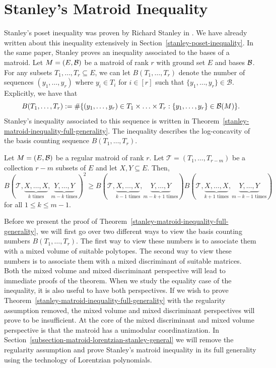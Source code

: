 \documentclass{puthesis-UG}
\begin{document}
\section{Stanley's Matroid Inequality} \label{sec:stanley-matroid-inequality}

Stanley's poset inequality was proven by Richard Stanley in \cite{STANLEY}. We have already written about this inequality extensively in Section~\ref{stanley-poset-inequality}. In the same paper, Stanley proves an inequality associated to the bases of a matroid. Let $M = (E, \mathcal{B})$ be a matroid of rank $r$ with ground set $E$ and bases $\mathcal{B}$. For any subsets $T_1, \ldots, T_r \subseteq E$, we can let $B(T_1, \ldots, T_r)$ denote the number of sequences $(y_1, \ldots, y_r)$ where $y_i \in T_i$ for $i \in [r]$ such that $\{y_1, \ldots, y_r\} \in \mathcal{B}$. Explicitly, we have that 
\[
	B(T_1, \ldots, T_r) := \# \{ (y_1, \ldots, y_r) \in T_1 \times \ldots \times T_r : \{y_1, \ldots, y_r\} \in \mathcal{B}(M) \}.
\]
Stanley's inequality associated to this sequence is written in Theorem~\ref{stanley-matroid-inequality-full-generality}. The inequality describes the log-concavity of the basis counting sequence $B(T_1, \ldots, T_r)$. 

\begin{thm} \label{stanley-matroid-inequality-full-generality}
	Let $M = (E, \mathcal{B})$ be a regular matroid of rank $r$. Let $\mathcal{T} = (T_1, \ldots, T_{r-m})$ be a collection $r-m$ subsets of $E$ and let $X, Y \subseteq E$. Then, 
	\[
		B(\mathcal{T}, \underbrace{X, \ldots, X}_{k \text{ times}}, \underbrace{Y, \ldots, Y}_{m-k \text{ times}})^2 \geq B(\mathcal{T}, \underbrace{X, \ldots, X}_{k-1 \text{ times}}, \underbrace{Y, \ldots, Y}_{m-k+1 \text{ times}}) B(\mathcal{T}, \underbrace{X, \ldots, X}_{k+1 \text{ times}}, \underbrace{Y, \ldots, Y}_{m-k-1 \text{ times}})
	\]
	for all $1 \leq k \leq m-1$. 
\end{thm}

Before we present the proof of Theorem~\ref{stanley-matroid-inequality-full-generality}, we will first go over two different ways to view the basis counting numbers $B(T_1, \ldots, T_r)$. The first way to view these numbers is to associate them with a mixed volume of suitable polytopes. The second way to view these numbers is to associate them with a mixed discriminant of suitable matrices. Both the mixed volume and mixed discriminant perspective will lead to immediate proofs of the theorem. When we study the equality case of the inequality, it is also useful to have both perspectives. If we wish to prove Theorem~\ref{stanley-matroid-inequality-full-generality} with the regularity assumption removed, the mixed volume and mixed discriminant perspectives will prove to be insufficient. At the core of the mixed discriminant and mixed volume perspective is that the matroid has a unimodular coordinatization. In Section~\ref{subsection-matroid-lorentzian-stanley-general} we will remove the regularity assumption and prove Stanley's matroid inequality in its full generality using the technology of Lorentzian polynomials.
\end{document}

